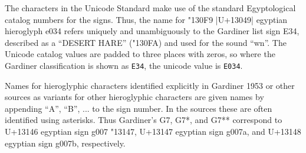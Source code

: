The characters in the Unicode Standard make use of the standard Egyptological catalog
numbers for the signs. Thus, the name for {\hiero\char"130F9} |U+13049| egyptian hieroglyph e034 refers
uniquely and unambiguously to the Gardiner list sign E34, described as a “{\aegean DESERT HARE}” ({\hiero \char"130FA}) and used for the sound “wn”. The Unicode catalog values are padded to three places with
zeros, so where the Gardiner classification is shown as \texttt{E34}, the unicode value is \texttt{E034}. 

Names for hieroglyphic characters identified explicitly in Gardiner 1953 or other sources as
variants for other hieroglyphic characters are given names by appending “A”, “B”, ... to the sign number. In the sources these are often identified using asterisks. Thus Gardiner’s G7,
G7*, and G7** correspond to U+13146 egyptian sign g007 {\hiero \char"13147}, U+13147 egyptian sign g007a, and U+13148 egyptian sign g007b, respectively.



